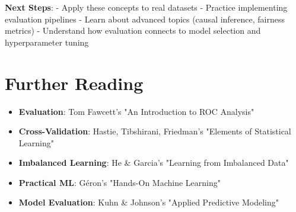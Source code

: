 \documentclass{article}
\begin{document}
\textbf{Next Steps}:
- Apply these concepts to real datasets
- Practice implementing evaluation pipelines
- Learn about advanced topics (causal inference, fairness metrics)
- Understand how evaluation connects to model selection and hyperparameter tuning

\section{Further Reading}

\begin{itemize}
    \item \textbf{Evaluation}: Tom Fawcett's "An Introduction to ROC Analysis"
    \item \textbf{Cross-Validation}: Hastie, Tibshirani, Friedman's "Elements of Statistical Learning"
    \item \textbf{Imbalanced Learning}: He \& Garcia's "Learning from Imbalanced Data"
    \item \textbf{Practical ML}: Géron's "Hands-On Machine Learning"
    \item \textbf{Model Evaluation}: Kuhn \& Johnson's "Applied Predictive Modeling"
\end{itemize}
\end{document}
